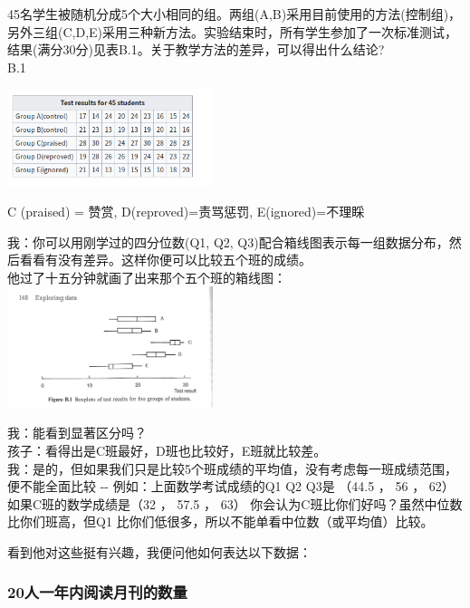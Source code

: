 45名学生被随机分成5个大小相同的组。两组(A,B)采用目前使用的方法(控制组)，另外三组(C,D,E)采用三种新方法。实验结束时，所有学生参加了一次标准测试，结果(满分30分)见表B.1。关于教学方法的差异，可以得出什么结论?\\
B.1

\includegraphics[width=6cm]{Screenshotfrom2023-01-0222-13-24.png}

C (praised) = 赞赏, D(reproved)=责骂惩罚, E(ignored)=不理睬

我：你可以用刚学过的四分位数(Q1, Q2, Q3)配合箱线图表示每一组数据分布，然后看看有没有差异。这样你便可以比较五个班的成绩。\\
他过了十五分钟就画了出来那个五个班的箱线图：\\

\includegraphics[width=6cm]{图片61-3.png}

我：能看到显著区分吗？\\
孩子：看得出是C班最好，D班也比较好，E班就比较差。\\
我：是的，但如果我们只是比较5个班成绩的平均值，没有考虑每一班成绩范围，便不能全面比较
-\/- 例如：上面数学考试成绩的Q1 Q2 Q3是 （44.5 ， 56 ， 62）
如果C班的数学成绩是（32 ， 57.5 ， 63）
你会认为C班比你们好吗？虽然中位数比你们班高，但Q1
比你们低很多，所以不能单看中位数（或平均值）比较。

看到他对这些挺有兴趣，我便问他如何表达以下数据：\\

\hypertarget{ux4ebaux4e00ux5e74ux5185ux9605ux8bfbux6708ux520aux7684ux6570ux91cf}{%
\subsubsection{20人一年内阅读月刊的数量}\label{ux4ebaux4e00ux5e74ux5185ux9605ux8bfbux6708ux520aux7684ux6570ux91cf}}

